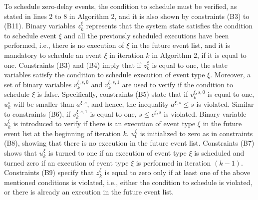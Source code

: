 \documentclass[]{interact}
\theoremstyle{plain}%
\theoremstyle{definition}
\theoremstyle{remark}
\begin{document}
To schedule zero-delay events, the condition to schedule must be verified, as stated in lines 2 to 8 in Algorithm 2, and it is also shown by constraints (B3) to (B11). Binary variables $z^{\xi}_{k}$ represents that the system state satisfies the condition to schedule event $\xi$ and all the previously scheduled executions have been performed, i.e., there is no execution of $\xi$ in the future event list, and it is mandatory to schedule an event ${\xi}$ in iteration $k$ in Algorithm 2, if it is equal to one.
Constraints (B3) and (B4) imply that if $z^{\xi}_k$ is equal to one, the state variables satisfy the condition to schedule execution of event type $\xi$. Moreover, a set of binary variables $v^{\xi,s,0}_k$ and $v^{\xi,s,1}_k$ are used to verify if the condition to schedule $\xi$ is false. Specifically, constraints (B5) state that if  $v^{\xi,s,0}_k$ is equal to one, $u^s_k$ will be smaller than $a^{\xi,s}$, and hence, the inequality $a^{\xi,s}\le s$ is violated. Similar to constraints (B6), if $v^{\xi,s,1}_k$ is equal to one, $s \le c^{\xi,s}$ is violated. %
Binary variable $u^{\xi}_k$ is introduced to verify if there is an execution of event type $\xi$ in the future event list at the beginning of iteration $k$. $u^{\xi}_{0}$ is initialized to zero as in constraints (B8), showing that there is no execution in the future event list. Constraints (B7) shows that $u^{\xi}_k$ is turned to one if an execution of event type ${\xi}$ is scheduled and turned zero if an execution of event type ${\xi}$ is performed in iteration $(k-1)$.
Constraints (B9) specify that $z^{\xi}_k$ is equal to zero only if at least one of the above mentioned conditions is violated, i.e., either the condition to schedule is violated, or there is already an execution in the future event list. 
\end{document}
